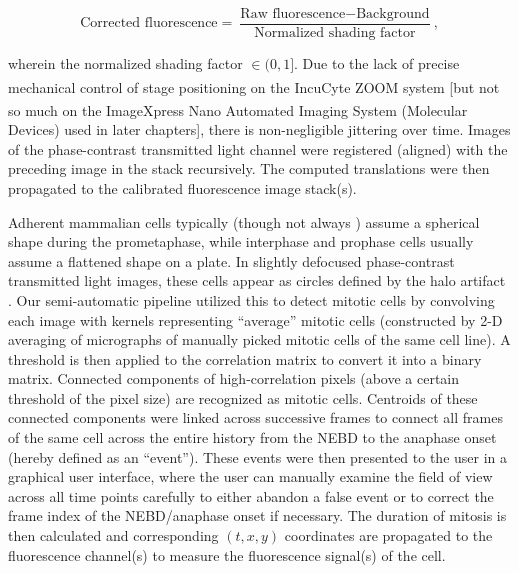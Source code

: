 \begin{equation*}
    \text{Corrected fluorescence} = \dfrac{\text{Raw fluorescence} - \text{Background}}{\text{Normalized shading factor}},
\end{equation*}

\noindent wherein the normalized shading factor $\in (0, 1]$. Due to the lack of precise mechanical control of stage positioning on the IncuCyte\textsuperscript{\textregistered} ZOOM system [but not so much on the ImageXpress\textsuperscript{\textregistered} Nano Automated Imaging System (Molecular Devices) used in later chapters], there is non-negligible jittering over time. Images of the phase-contrast transmitted light channel were registered (aligned) with the preceding image in the stack recursively. The computed translations were then propagated to the calibrated fluorescence image stack(s).

Adherent mammalian cells typically (though not always \cite{Syntelic+Merotelic}) assume a spherical shape during the prometaphase, while interphase and prophase cells usually assume a flattened shape on a plate. In slightly defocused phase-contrast transmitted light images, these cells appear as circles defined by the halo artifact \cite{PhaseContrastHalo}. Our semi-automatic pipeline utilized this to detect mitotic cells by convolving each image with kernels representing ``average'' mitotic cells (constructed by 2-D averaging of micrographs of manually picked mitotic cells of the same cell line). A threshold is then applied to the correlation matrix to convert it into a binary matrix. Connected components of high-correlation pixels (above a certain threshold of the pixel size) are recognized as mitotic cells. Centroids of these connected components were linked across successive frames to connect all frames of the same cell across the entire history from the NEBD to the anaphase onset (hereby defined as an ``event''). These events were then presented to the user in a graphical user interface, where the user can manually examine the field of view across all time points carefully to either abandon a false event or to correct the frame index of the NEBD/anaphase onset if necessary. The duration of mitosis is then calculated and corresponding $(t, x, y)$ coordinates are propagated to the fluorescence channel(s) to measure the fluorescence signal(s) of the cell.

